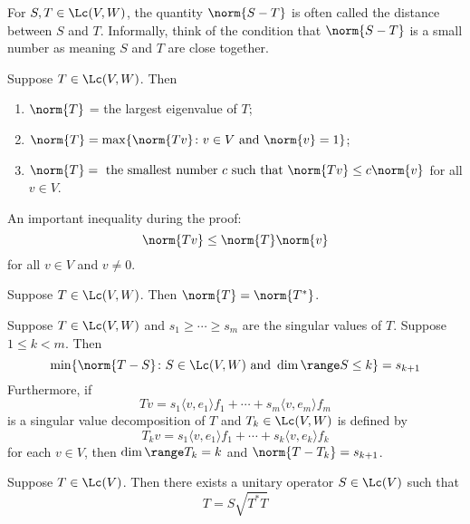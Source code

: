 \documentclass{extarticle}
\begin{document}
\begin{remark}
    For \(S, T \in \Lc(V, W)\), the quantity \(\norm{S - T}\) is often called the distance between
    \(S\) and \(T\). Informally, think of the condition that \(\norm{S - T}\) is a small number
    as meaning \(S\) and \(T\) are close together.
\end{remark}

\begin{thm}
    Suppose \(T \in \Lc(V, W)\). Then
    \begin{enumerate}[label=(\alph*)]
        \item \(\norm{T}\) = the largest eigenvalue of \(T\);
        \item \(\norm{T} = \max \{\norm{Tv} \colon v \in V \text{ and } \norm{v} = 1\} \);
        \item \(\norm{T} = \text{ the smallest number } c \text{ such that } \norm{Tv} \leq c \norm{v}\)
        for all \(v \in V\).
    \end{enumerate}
\end{thm}

\begin{remark}
    An important inequality during the proof:
    \[\norm{Tv} \leq \norm{T} \norm{v}\]
    for all \(v \in V\) and \(v \neq 0\).
\end{remark}

\begin{corollary}
    Suppose \(T \in \Lc(V, W)\). Then \(\norm{T} = \norm{T^*}\).
\end{corollary}

\begin{thm}
Suppose \(T \in \Lc(V, W)\) and \(s_1 \geq \cdots \geq s_m\) are the singular
values of \(T\). Suppose \(1 \leq k < m\). Then
\[\min \{\norm{T - S} \colon S \in \Lc(V, W) \text{ and }
\dim \range S \leq k\} = s_{k+1}\]
Furthermore, if
\[Tv = s_1 \langle v,e_1 \rangle f_1 + \cdots + s_m \langle v,e_m \rangle f_m\]
is a singular value decomposition of \(T\) and \(T_k \in \Lc(V, W)\) is
defined by
\[T_k v = s_1 \langle v,e_1 \rangle f_1 + \cdots + s_k \langle v,e_k \rangle f_k\]
for each \(v \in V\), then \(\dim \range T_k = k\) and \(\norm{T - T_k} = s_{k+1}\).
\end{thm}

\begin{thm}
    Suppose \(T \in \Lc(V)\). Then there exists a unitary operator
    \(S \in \Lc(V)\) such that
    \[T = S \sqrt{T^* T}\]
\end{thm}
\end{document}
